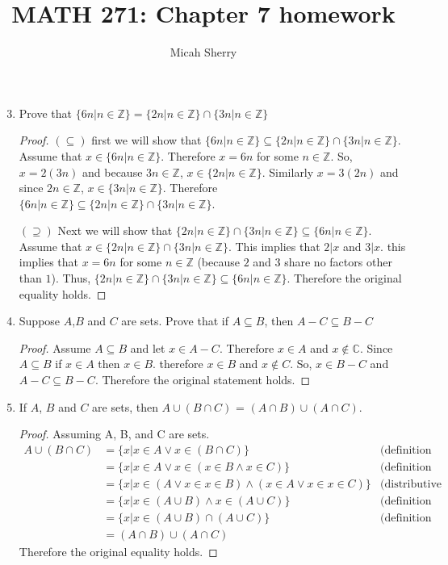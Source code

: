 \documentclass{article}
\title{MATH 271: Chapter 7 homework}
\author{Micah Sherry}
\newcommand{\Z}{\mathbb{Z}}
\newcommand{\C}{\mathbb{C}}
\newcommand{\nitem}[1] %
{
	\setcounter{enumi}{#1}
	\addtocounter{enumi}{-1}
	\item
}
\begin{document}
	\maketitle
	
	\begin{enumerate}
		\nitem{2} Prove that $\{6n | n \in \Z \} = \{2n | n \in \Z \} \cap \{3n | n \in \Z \}$
		\begin{proof}
			$(\subseteq)$ first we will show that $\{6n | n \in \Z \} \subseteq \{2n | n \in \Z \} \cap \{3n | n \in \Z \}$. \\
			Assume that $x \in \{6n | n \in \Z \}$. Therefore $x = 6n$ for some $n \in \Z$. So, $x = 2(3n)$ and because $3n \in \Z$, $x \in \{2n | n \in \Z \}$. Similarly $x=3(2n)$ and since $2n \in \Z$,  $x \in \{3n | n \in \Z \}$.
			Therefore $\{6n | n \in \Z \} \subseteq \{2n | n \in \Z \} \cap \{3n | n \in \Z \}$.
			
			$(\supseteq)$ Next we will show that $\{2n | n \in \Z \} \cap \{3n | n \in \Z \} \subseteq \{6n | n \in \Z \}$. \\
			Assume that $x \in \{2n | n \in \Z \} \cap \{3n | n \in \Z \}$. This implies that $2|x$ and $3|x$.
			this implies that $x = 6n$ for some $n \in \Z$ (because $2$ and $3$ share no factors other than $1$). Thus, $\{2n | n \in \Z \} \cap \{3n | n \in \Z \} \subseteq \{6n | n \in \Z \}$. Therefore the original equality holds. 
		\end{proof}
		
		\nitem{6} Suppose $A$,$B$ and $C$ are sets. Prove that if $A \subseteq B$, then $A -C \subseteq B-C$
		\begin{proof}
			Assume $A \subseteq B$ and let $x \in  A - C$. Therefore $x \in A$ and $x \not\in \C$. Since $A \subseteq B$ if $x \in A$ then $x \in B$. therefore $x \in B $ and $x \not\in C$. So, $x \in B-C$ and $A -C \subseteq B-C$. Therefore the original statement holds.
			
		\end{proof}
		
		\nitem{8} If $A$, $B$ and $C$ are sets, then $A \cup (B \cap C)$ = $(A \cap B)\cup  (A \cap C)$. 
		\begin{proof}
			
			Assuming  A, B, and C are sets.
			\begin{align*}
				A \cup (B \cap C) &= \{x| x \in A \vee x \in (B \cap C)\} & \text{(definition of union)}\\
				&= \{x| x \in A \vee x \in (x \in B \wedge x \in C)\} & \text{(definition of intersection)}\\
				&= \{x| x \in (A \vee x \in x \in B) \wedge(x \in A \vee x \in x \in C)\} & \text{(distributive property)}\\
				&= \{x| x \in (A \cup B) \wedge x \in( A \cup C)\} & \text{(definition of union)}\\
				&= \{x| x \in (A \cup B) \cap ( A \cup C)\} & \text{(definition of union)}\\
				&=(A \cap B)\cup  (A \cap C)
			\end{align*}
			Therefore the original equality holds.
		\end{proof}
		

\end{enumerate}
\end{document}
